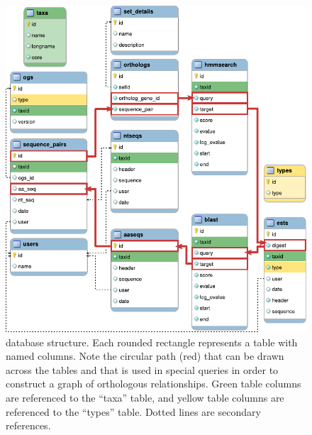 \begin{figure}[ht]
	\centering
	\includegraphics[width=\textwidth]{img/dbstructure.pdf}
	\caption[Complete \pname database structure]{
		\pname database structure. Each rounded rectangle represents a table with
		named columns. Note the circular path (red) that can be drawn across the
		tables and that is used in special  queries in order to construct
		a graph of orthologous relationships. Green table columns are referenced to
		the ``taxa'' table, and yellow table columns are referenced to the ``types''
		table. Dotted lines are secondary references.
	}
	\label{fig:dbstructure}
\end{figure}


